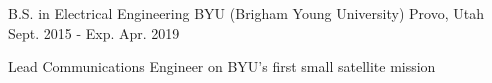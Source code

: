 

\begin{cventries}

  \cventry
  {B.S. in Electrical Engineering} %
  {BYU (Brigham Young University)} %
  {Provo, Utah} %
  {Sept. 2015 - Exp. Apr. 2019} %
    {
      \begin{cvitems} %
      \item {Lead Communications Engineer on BYU's first small satellite mission}
      \end{cvitems}
    }

\end{cventries}
